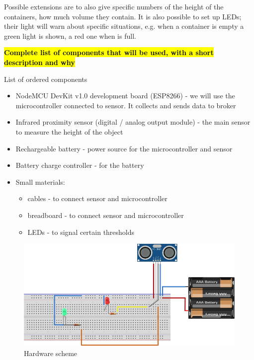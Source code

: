 \documentclass{article}
\begin{document}
Possible extensions are to also give specific numbers of the height of the
containers, how much volume they contain.
It is also possible to set up LEDs; their light will warn about specific
situations, e.g. when a container is empty a green light is shown, a red one when
is full.

\textcolor{red}{\textbf{\hl{Complete list of components that will be used, with a short description and why}}}

List of ordered components
\begin{itemize}
\item NodeMCU DevKit v1.0 development board (ESP8266) - we will use the microcontroller connected to sensor. It collects and sends data to broker
\item Infrared proximity sensor (digital / analog output module) - the main sensor to measure the height of the object
\item Rechargeable battery - power source for the microcontroller and sensor
\item Battery charge controller - for the battery
\item Small materials: 
	\begin{itemize}
		\item cables - to connect sensor and microcontroller
		\item breadboard - to connect sensor and microcontroller
		\item LEDs - to signal certain thresholds
	\end{itemize}
\end{itemize}

\begin{figure}[]
	\centering
	\includegraphics[scale=0.4]{images/schema_bb.png}
	\caption{Hardware scheme}	
	\label{schema_bb}
\end{figure}
\end{document}
